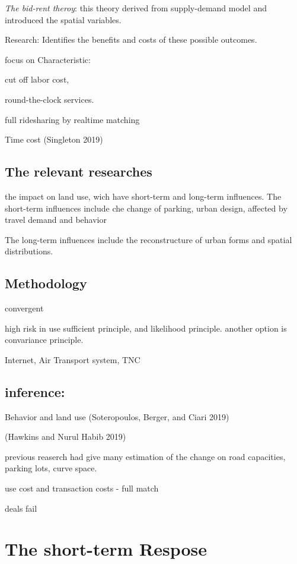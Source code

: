 \documentclass[12pt,]{article}
\begin{document}
\emph{The bid-rent theroy}: this theory derived from supply-demand model
and introduced the spatial variables.

Research: Identifies the benefits and costs of these possible outcomes.

focus on Characteristic:

cut off labor cost,

round-the-clock services.

full ridesharing by realtime matching

Time cost (Singleton 2019)

\hypertarget{the-relevant-researches}{%
\subsection{The relevant researches}\label{the-relevant-researches}}

the impact on land use, wich have short-term and long-term influences.
The short-term influences include che change of parking, urban design,
affected by travel demand and behavior

The long-term influences include the reconstructure of urban forms and
spatial distributions.

\hypertarget{methodology}{%
\subsection{Methodology}\label{methodology}}

convergent

high risk in use sufficient principle, and likelihood principle. another
option is convariance principle.

Internet, Air Transport system, TNC

\hypertarget{inference}{%
\subsection{inference:}\label{inference}}

Behavior and land use (Soteropoulos, Berger, and Ciari 2019)

(Hawkins and Nurul Habib 2019)

previous reaserch had give many estimation of the change on road
capacities, parking lots, curve space.

use cost and transaction costs - full match

deals fail

\hypertarget{the-short-term-respose}{%
\section{The short-term Respose}\label{the-short-term-respose}}
\end{document}
